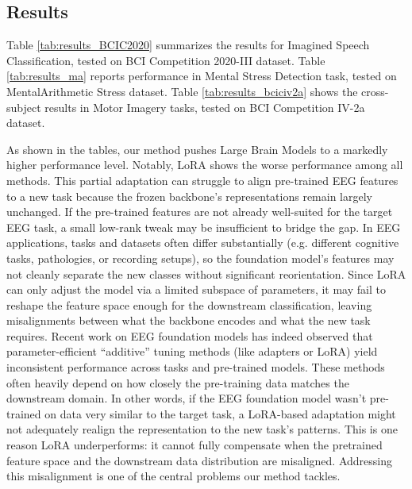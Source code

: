 \documentclass{article} %
\begin{document}


\subsection{Results}

Table \ref{tab:results_BCIC2020} summarizes the results for Imagined Speech Classification, tested on BCI Competition 2020-III dataset. Table \ref{tab:results_ma} reports performance in Mental Stress Detection task, tested on MentalArithmetic Stress dataset. Table \ref{tab:results_bciciv2a} shows the cross-subject results in Motor Imagery tasks, tested on BCI Competition IV-2a dataset.







As shown in the tables, our method pushes Large Brain Models to a markedly higher performance level.
Notably, LoRA shows the worse performance among all methods. This partial adaptation can struggle to align pre-trained EEG features to a new task because the frozen backbone’s representations remain largely unchanged. If the pre-trained features are not already well-suited for the target EEG task, a small low-rank tweak may be insufficient to bridge the gap. In EEG applications, tasks and datasets often differ substantially (e.g. different cognitive tasks, pathologies, or recording setups), so the foundation model’s features may not cleanly separate the new classes without significant reorientation. Since LoRA can only adjust the model via a limited subspace of parameters, it may fail to reshape the feature space enough for the downstream classification, leaving misalignments between what the backbone encodes and what the new task requires. Recent work on EEG foundation models has indeed observed that parameter-efficient “additive” tuning methods (like adapters or LoRA) yield inconsistent performance across tasks and pre-trained models. These methods often heavily depend on how closely the pre-training data matches the downstream domain. In other words, if the EEG foundation model wasn’t pre-trained on data very similar to the target task, a LoRA-based adaptation might not adequately realign the representation to the new task’s patterns. This is one reason LoRA underperforms: it cannot fully compensate when the pretrained feature space and the downstream data distribution are misaligned. Addressing this misalignment is one of the central problems our method tackles.
\end{document}
